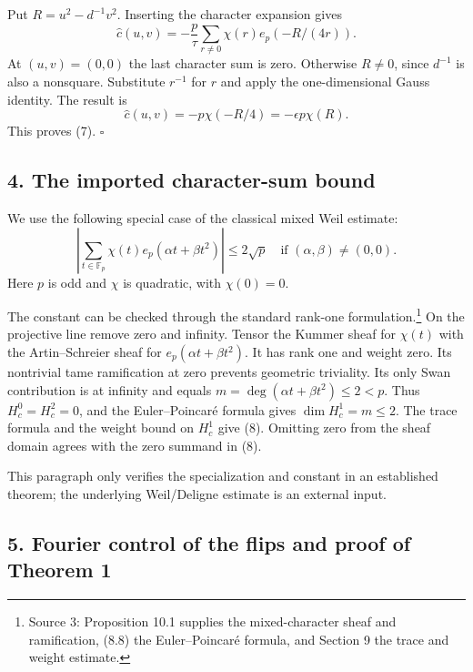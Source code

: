 \documentclass[
  11pt,
]{article}
\begin{document}
Put \(R=u^2-d^{-1}v^2\). Inserting the character expansion gives \[
\widehat c(u,v)=-\frac p\tau\sum_{r\ne0}\chi(r)e_p(-R/(4r)).
\] At \((u,v)=(0,0)\) the last character sum is zero. Otherwise
\(R\ne0\), since \(d^{-1}\) is also a nonsquare. Substitute \(r^{-1}\)
for \(r\) and apply the one-dimensional Gauss identity. The result is \[
\widehat c(u,v)=-p\chi(-R/4)=-\epsilon p\chi(R).
\] This proves (7). \(\square\)

\subsection{4. The imported character-sum
bound}\label{the-imported-character-sum-bound}

We use the following special case of the classical mixed Weil estimate:
\[
\left|\sum_{t\in\mathbb F_p}\chi(t)e_p(\alpha t+\beta t^2)\right|
\leq2\sqrt p
\quad\text{if }(\alpha,\beta)\ne(0,0). \tag{8}
\] Here \(p\) is odd and \(\chi\) is quadratic, with \(\chi(0)=0\).

The constant can be checked through the standard rank-one
formulation.\footnote{Source 3: Proposition 10.1 supplies the
  mixed-character sheaf and ramification, (8.8) the Euler--Poincaré
  formula, and Section 9 the trace and weight estimate.} On the
projective line remove zero and infinity. Tensor the Kummer sheaf for
\(\chi(t)\) with the Artin--Schreier sheaf for
\(e_p(\alpha t+\beta t^2)\). It has rank one and weight zero. Its
nontrivial tame ramification at zero prevents geometric triviality. Its
only Swan contribution is at infinity and equals
\(m=\deg(\alpha t+\beta t^2)\leq2<p\). Thus \(H_c^0=H_c^2=0\), and the
Euler--Poincaré formula gives \(\dim H_c^1=m\leq2\). The trace formula
and the weight bound on \(H_c^1\) give (8). Omitting zero from the sheaf
domain agrees with the zero summand in (8).

This paragraph only verifies the specialization and constant in an
established theorem; the underlying Weil/Deligne estimate is an external
input.

\subsection{5. Fourier control of the flips and proof of Theorem
1}\label{fourier-control-of-the-flips-and-proof-of-theorem-1}
\end{document}
